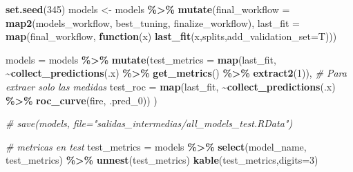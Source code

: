 \documentclass[12pt,a4paper,]{book}
\newenvironment{Shaded}{\begin{snugshade}}{\end{snugshade}}
\newcommand{\AttributeTok}[1]{\textcolor[rgb]{0.13,0.29,0.53}{#1}}
\newcommand{\CommentTok}[1]{\textcolor[rgb]{0.56,0.35,0.01}{\textit{#1}}}
\newcommand{\ControlFlowTok}[1]{\textcolor[rgb]{0.13,0.29,0.53}{\textbf{#1}}}
\newcommand{\DecValTok}[1]{\textcolor[rgb]{0.00,0.00,0.81}{#1}}
\newcommand{\FunctionTok}[1]{\textcolor[rgb]{0.13,0.29,0.53}{\textbf{#1}}}
\newcommand{\NormalTok}[1]{#1}
\newcommand{\OtherTok}[1]{\textcolor[rgb]{0.56,0.35,0.01}{#1}}
\newcommand{\SpecialCharTok}[1]{\textcolor[rgb]{0.81,0.36,0.00}{\textbf{#1}}}
\numberwithin{dummy}{section}
\theoremstyle{ocrenumbox}
\theoremstyle{blacknumex}
\theoremstyle{blacknumbox}
\theoremstyle{ocrenum}
\theoremstyle{ocrenum}
\begin{document}
\begin{Shaded}
\begin{Highlighting}[]
\FunctionTok{set.seed}\NormalTok{(}\DecValTok{345}\NormalTok{)}
\NormalTok{models }\OtherTok{\textless{}{-}}\NormalTok{ models }\SpecialCharTok{\%\textgreater{}\%} 
  \FunctionTok{mutate}\NormalTok{(}\AttributeTok{final\_workflow =} \FunctionTok{map2}\NormalTok{(models\_workflow, best\_tuning, finalize\_workflow),}
         \AttributeTok{last\_fit =} \FunctionTok{map}\NormalTok{(final\_workflow, }\ControlFlowTok{function}\NormalTok{(x) }\FunctionTok{last\_fit}\NormalTok{(x,splits,}\AttributeTok{add\_validation\_set=}\NormalTok{T)))}

\NormalTok{models }\OtherTok{=}\NormalTok{ models }\SpecialCharTok{\%\textgreater{}\%} 
  \FunctionTok{mutate}\NormalTok{(}\AttributeTok{test\_metrics =} \FunctionTok{map}\NormalTok{(last\_fit,      }
                            \SpecialCharTok{\textasciitilde{}}\FunctionTok{collect\_predictions}\NormalTok{(.x) }\SpecialCharTok{\%\textgreater{}\%}                                                  \FunctionTok{get\_metrics}\NormalTok{() }\SpecialCharTok{\%\textgreater{}\%}  
                              \FunctionTok{extract2}\NormalTok{(}\DecValTok{1}\NormalTok{)), }\CommentTok{\# Para extraer solo las medidas}
         \AttributeTok{test\_roc =} \FunctionTok{map}\NormalTok{(last\_fit,}
                        \SpecialCharTok{\textasciitilde{}}\FunctionTok{collect\_predictions}\NormalTok{(.x) }\SpecialCharTok{\%\textgreater{}\%}                                              \FunctionTok{roc\_curve}\NormalTok{(fire, .pred\_0))                           ) }

\CommentTok{\# save(models, file="salidas\_intermedias/all\_models\_test.RData")}

\CommentTok{\# metricas en test}
\NormalTok{test\_metrics }\OtherTok{=}\NormalTok{ models }\SpecialCharTok{\%\textgreater{}\%} \FunctionTok{select}\NormalTok{(model\_name, test\_metrics) }\SpecialCharTok{\%\textgreater{}\%} \FunctionTok{unnest}\NormalTok{(test\_metrics)}
\FunctionTok{kable}\NormalTok{(test\_metrics,}\AttributeTok{digits=}\DecValTok{3}\NormalTok{)}


\end{Highlighting}
\end{Shaded}
\end{document}
